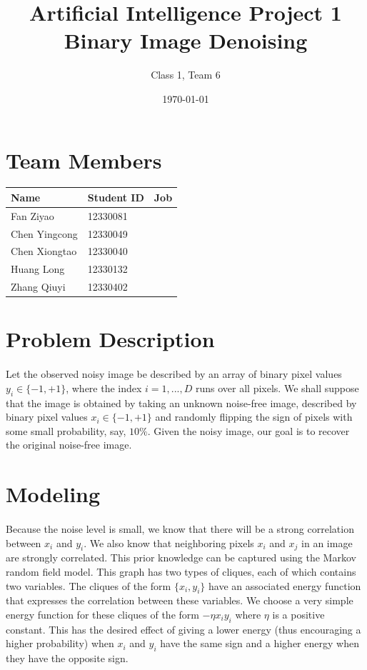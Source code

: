 \documentclass{article}
\title{}
\begin{document}


\title{
Artificial Intelligence Project 1 \\
Binary Image Denoising
}
\author{Class 1, Team 6}
\date{\today}
\maketitle

\tableofcontents
\section{Team Members}

\begin{table}[H]
\centering
\begin{tabular}{l l l}
Name & Student ID  & Job\\
\hline
Fan Ziyao & 12330081 & \\
Chen Yingcong & 12330049 & \\
Chen Xiongtao & 12330040 & \\
Huang Long & 12330132 &  \\
Zhang Qiuyi & 12330402 & 
\end{tabular}
\end{table}

\section{Problem Description}
\paragraph{}
Let the observed noisy image be described by an array of binary pixel values $y_i \in \{−1, +1\}$, where the index $i = 1, ..., D$ runs over all pixels. We shall suppose that the image is obtained by taking an unknown noise-free image, described by binary pixel values $x_i \in \{−1, +1\}$ and randomly flipping the sign of pixels with some small probability, say, $10\%$. Given the noisy image, our goal is to recover the original noise-free image.

\section{Modeling}
\paragraph{}
Because the noise level is small, we know that there will be a strong correlation between $x_i$ and $y_i$. We also know that neighboring pixels $x_i$ and $x_j$ in an image are strongly correlated. This prior knowledge can be captured using the Markov random field model. This graph has two types of cliques, each of which contains two variables. The cliques of the form $\{x_i, y_i\}$ have an associated energy function that expresses the correlation between these variables. We choose a very simple energy function for these cliques of the form $-\eta x_i y_i$ where $\eta$ is a positive constant. This has the desired effect of giving a lower energy (thus encouraging a higher probability) when $x_i$ and $y_i$ have the same sign and a higher energy when they have the opposite sign.
\end{document}
